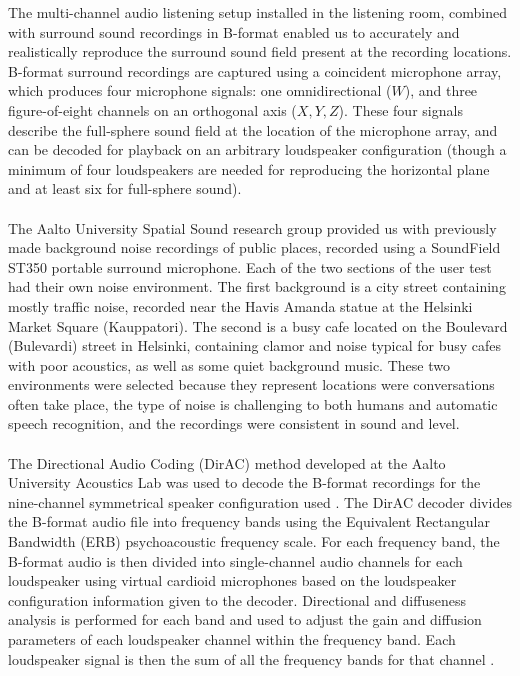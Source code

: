 \documentclass[english, 12pt, a4paper, pdftex, elec, utf8]{aaltothesis}
\begin{document}
The multi-channel audio listening setup installed in the listening room, combined with surround sound recordings in B-format enabled us to accurately and realistically reproduce the surround sound field present at the recording locations. B-format surround recordings are captured using a coincident microphone array, which produces four microphone signals: one omnidirectional ($W$), and three figure-of-eight channels on an orthogonal axis ($X,Y,Z$). These four signals describe the full-sphere sound field at the location of the microphone array, and can be decoded for playback on an arbitrary loudspeaker configuration (though a minimum of four loudspeakers are needed for reproducing the horizontal plane and at least six for full-sphere sound). \cite{furness1990ambisonics, pulkki2015communication} \\\\
The Aalto University Spatial Sound research group provided us with previously made background noise recordings of public places, recorded using a SoundField ST350 portable surround microphone. Each of the two sections of the user test had their own noise environment. The first background is a city street containing mostly traffic noise, recorded near the Havis Amanda statue at the Helsinki Market Square (Kauppatori). The second is a busy cafe located on the Boulevard (Bulevardi) street in Helsinki, containing clamor and noise typical for busy cafes with poor acoustics, as well as some quiet background music. These two environments were selected because they represent locations were conversations often take place, the type of noise is challenging to both humans and automatic speech recognition, and the recordings were consistent in sound and level. \\\\
The Directional Audio Coding (DirAC) method developed at the Aalto University Acoustics Lab was used to decode the B-format recordings for the nine-channel symmetrical speaker configuration used \cite{pulkki2015communication, pulkki2006directional}. The DirAC decoder divides the B-format audio file into frequency bands using the Equivalent Rectangular Bandwidth (ERB) psychoacoustic frequency scale. For each frequency band, the B-format audio is then divided into single-channel audio channels for each loudspeaker using virtual cardioid microphones based on the loudspeaker configuration information given to the decoder. Directional and diffuseness analysis is performed for each band and used to adjust the gain and diffusion parameters of each loudspeaker channel within the frequency band. Each loudspeaker signal is then the sum of all the frequency bands for that channel \cite{pulkki2006directional}. \\\\
\end{document}
